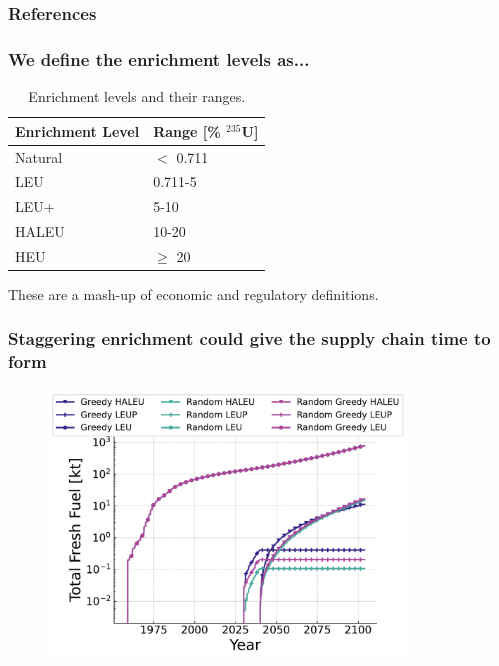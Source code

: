 \documentclass[9pt]{beamer}
\begin{document}
\begin{frame}[allowframebreaks]
  \frametitle{References}
  
  {\footnotesize  }

\end{frame}

\appendix

 \begin{frame}
    \frametitle{We define the enrichment levels as...}
    \begin{table}[H]
        \centering
        \caption{Enrichment levels and their ranges.}
        \label{tab:enrichment_levels}
        \begin{tabular}{l l}
           \hline
           \textbf{Enrichment Level} & \textbf{Range [\%  $^{235}$U]} \\
           \hline
           Natural & $<$ 0.711 \\
           LEU & 0.711-5 \\
           LEU+ & 5-10 \\
           HALEU & 10-20 \\
           HEU & $\geq$ 20  \\
           \hline
        \end{tabular}
     \end{table}
     \vspace{8pt}
     These are a mash-up of economic and regulatory definitions.
  \end{frame}

\begin{frame}
  \frametitle{Staggering enrichment could give the supply chain time to form}
  \begin{figure}
      \centering
      \includegraphics[width=0.85\textwidth]{../images/total_fuel_over_time.pdf}
  \end{figure}
\end{frame}
\end{document}
